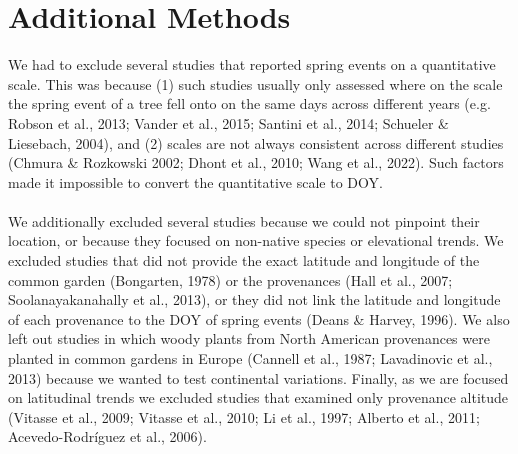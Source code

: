 \documentclass{article}
\begin{document}
\section{Additional Methods}
\label{section:addmethods}
We had to exclude several studies that reported spring events on a quantitative scale. This was because (1) such studies usually only assessed where on the scale the spring event of a tree fell onto on the same days across different years (e.g. Robson et al., 2013; Vander et al., 2015; Santini et al., 2014; Schueler \& Liesebach, 2004), and (2) scales are not always consistent across different studies (Chmura \& Rozkowski 2002; Dhont et al., 2010; Wang et al., 2022). Such factors made it impossible to convert the quantitative scale to DOY.
\\
\\
We additionally excluded several studies because we could not pinpoint their location, or because they focused on non-native species or elevational trends. We excluded studies that did not provide the exact latitude and longitude of the common garden (Bongarten, 1978) or the provenances (Hall et al., 2007; Soolanayakanahally et al., 2013), or they did not link the latitude and longitude of each provenance to the DOY of spring events (Deans \& Harvey, 1996). We also left out studies in which woody plants from North American provenances were planted in common gardens in Europe (Cannell et al., 1987; Lavadinovic et al., 2013) because we wanted to test continental variations. Finally, as we are focused on latitudinal trends we excluded studies that examined only provenance altitude (Vitasse et al., 2009; Vitasse et al., 2010; Li et al., 1997; Alberto et al., 2011; Acevedo-Rodríguez et al., 2006). 

\end{document}
